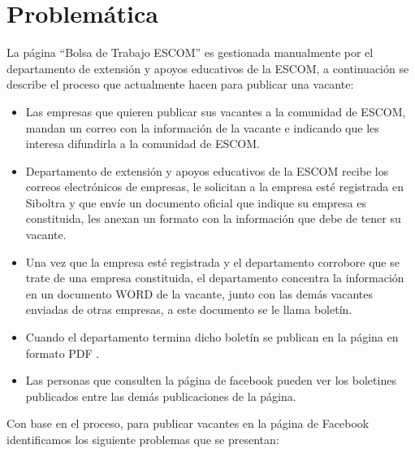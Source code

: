 \section{Problemática}

La página ``Bolsa de Trabajo ESCOM'' es gestionada manualmente por el departamento de extensión y apoyos educativos de la ESCOM, a continuación se describe el proceso que actualmente hacen para publicar una vacante:

\begin{itemize}
    \item Las empresas que quieren publicar sus vacantes a la comunidad de ESCOM, mandan un correo con la información de la vacante e indicando que les interesa difundirla a la comunidad de ESCOM.

    \item Departamento de extensión y apoyos educativos de la ESCOM recibe los correos electrónicos de empresas, le solicitan a la empresa esté registrada en Siboltra y que envíe un documento oficial que indique su empresa es constituida, les anexan un formato con la información que debe de tener su vacante. 

    \item Una vez que la empresa esté registrada y el departamento corrobore que se trate de una empresa constituida, el departamento concentra la información en un documento WORD de la vacante, junto con las demás vacantes enviadas de otras empresas, a este documento se le llama boletín.

    \item Cuando el departamento termina dicho boletín se publican en la página en formato PDF .

    \item Las personas que consulten la página de facebook pueden ver los boletines publicados entre las demás publicaciones de la página. 
\end{itemize}
Con base en el proceso, para publicar vacantes en la página de Facebook identificamos los siguiente problemas que se presentan:
